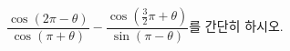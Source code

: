 $\dfrac{\cos(2\pi-\theta)}{\cos(\pi+\theta)}-\dfrac{\cos\left(\frac{3}{2}\pi+\theta\right)}{\sin(\pi-\theta)}$를 간단히 하시오.
